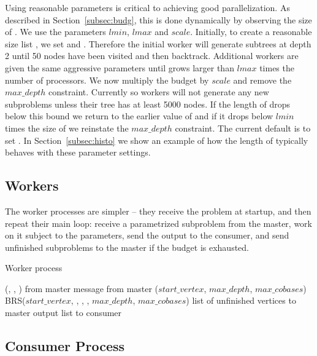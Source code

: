 \documentclass[a4paper,11pt]{article}   \usepackage{authblk} \usepackage[top=1.9cm,bottom=1.9cm,left=1.9cm,right=1.9cm]{geometry}
\newcommand{\mymaxdepth}{\ensuremath{\mathit{max\_depth}}\xspace}
\newcommand{\maxcobases}{\ensuremath{\mathit{max\_cobases}}\xspace}
\newcommand{\lmin}{\ensuremath{\mathit{lmin}}\xspace}
\newcommand{\lmax}{\ensuremath{\mathit{lmax}}\xspace}
\newcommand{\myscale}{\ensuremath{\mathit{scale}}\xspace}
\newcommand{\startvertex}{\ensuremath{\mathit{start\_vertex}}\xspace}
\newcommand{\mytrue}{\ensuremath{\textrm{true}}\xspace}
\begin{document}
Using reasonable parameters is critical to achieving good parallelization.
As described in Section~\ref{subsec:budg}, this is done dynamically
by observing the size of . We use the parameters \lmin, \lmax and \myscale.
Initially, to create a reasonable size list , we set   and .
Therefore the initial worker will generate subtrees at depth 2 until 50 nodes have
been visited and then backtrack. Additional workers are given the same aggressive parameters
until  grows larger than \lmax times the number of processors. We now multiply
the budget by \myscale and remove the \mymaxdepth constraint. Currently  so
workers will
not generate any new subproblems unless their tree has at least 5000 nodes.
If the length of  drops below this bound we return to the earlier value of
 and if it drops below \lmin times the size of  we
reinstate the \mymaxdepth constraint. The current default is to set .
In Section~\ref{subsec:histo} we show an example of how the length of 
typically behaves with these parameter settings. 

\subsection{Workers}

The worker processes are simpler -- they receive the problem at
startup, and then repeat their main loop: receive a
parametrized subproblem from the master, work on it subject to the
parameters, send the output to the consumer, and send unfinished
subproblems to the master if the budget is exhausted.  

\begin{algorithm}[ht!]
 \caption{Worker process}
 \label{alg:mplrs_worker}
 \begin{algorithmic}[1]
    (, , ) from master
   \While {\mytrue}
      message from master
     \EndIf
      (\startvertex, \mymaxdepth, \maxcobases) 
      BRS(\startvertex, , , , \mymaxdepth,  \maxcobases)
      list of unfinished vertices to master
      output list to consumer
   \EndWhile
  \EndProcedure
 \end{algorithmic}
\end{algorithm}

\subsection{Consumer Process}
\end{document}
